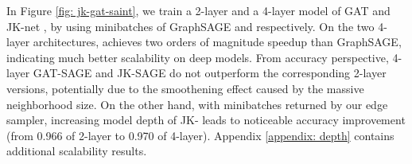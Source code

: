In Figure \ref{fig: jk-gat-saint}, we train a 2-layer and a 4-layer model of GAT \citep{gat} and JK-net \citep{jk-net}, by using minibatches of GraphSAGE and {\graphsaint} respectively. 
On the two 4-layer architectures, {\graphsaint} achieves two orders of magnitude speedup than GraphSAGE, indicating much better scalability on deep models. 
From accuracy perspective, 4-layer GAT-SAGE and JK-SAGE do not outperform the corresponding 2-layer versions, potentially due to the smoothening effect caused by the massive neighborhood size. On the other hand, with minibatches returned by our edge sampler, increasing model depth of JK-{\saint} leads to noticeable accuracy improvement (from 0.966 of 2-layer to 0.970 of 4-layer). 
Appendix \ref{appendix: depth} contains additional scalability results. 

